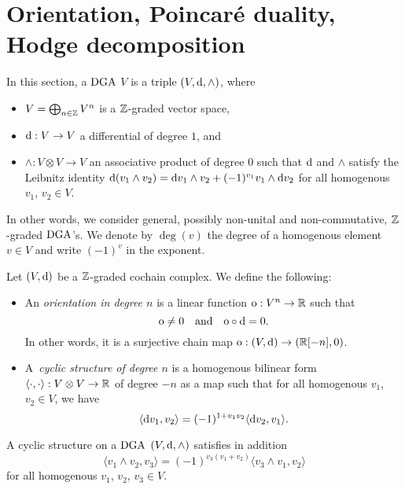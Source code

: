 \documentclass[\MainFolder/Text.tex]{subfiles}
\begin{document}
\section{Orientation, Poincar\'e duality, Hodge decomposition}
\label{SubSec:CycStr}

In this section, a $\mathrm{DGA}$ $V$ is a triple $(V,\mathrm{d},\wedge)$, where 
\begin{itemize}
\item $V = \bigoplus_{n\in \mathbb{Z}} V^n$ is a $\mathbb{Z}$-graded vector space,
\item $\mathrm{d}: V\rightarrow V$ a differential of degree $1$, and
\item $\wedge: V\otimes V \rightarrow V$ an associative product of degree $0$ such that $\mathrm{d}$ and $\wedge$ satisfy the Leibnitz identity $\mathrm{d}(v_1 \wedge v_2) = \mathrm{d} v_1 \wedge v_2 + (-1)^{v_1} v_1 \wedge\mathrm{d} v_2$ for all homogenous $v_1$, $v_2\in V$.
\end{itemize}
In other words, we consider general, possibly non-unital and non-commutative, $\mathbb{Z}$-graded $\mathrm{DGA}$'s. We denote by $\deg(v)$ the degree of a homogenous element $v\in V$ and write $(-1)^v$ in the exponent.
 

\begin{Definition}\label{Def:CycStr} 
Let $(V,\mathrm{d})$ be a $\mathbb{Z}$-graded cochain complex. We define the following:
\begin{itemize}
\item An \emph{orientation in degree $n$} is a linear function $\mathrm{o} : V^n \rightarrow \mathbb{R}$ such that
$$\mathrm{o} \neq 0\quad\text{and}\quad\mathrm{o} \circ \mathrm{d} = 0. $$
In other words, it is a surjective chain map $\mathrm{o} : (V,\mathrm{d}) \rightarrow (\mathbb{R}[-n],0)$.
\item A~\emph{cyclic structure of degree $n$} is a homogenous bilinear form $\langle \cdot, \cdot \rangle : V \otimes V \rightarrow \mathbb{R}$ of degree $-n$ as a map such that for all homogenous $v_1$, $v_2\in V$, we have
\begin{equation}\label{Eq:CycStr}
\langle \mathrm{d} v_1, v_2\rangle = (-1)^{1+v_1 v_2} \langle \mathrm{d} v_2, v_1 \rangle.
\end{equation}
\end{itemize}
A cyclic structure on a $\mathrm{DGA}$ $(V,\mathrm{d},\wedge)$ satisfies in addition  
\begin{equation}\label{Eq:CycStrII}
\langle v_1 \wedge v_2, v_3 \rangle = (-1)^{v_3(v_1 + v_2)}\langle v_3\wedge v_1, v_2 \rangle
\end{equation}
for all homogenous $v_1$, $v_2$, $v_3\in V$.
\end{Definition}
\end{document}
